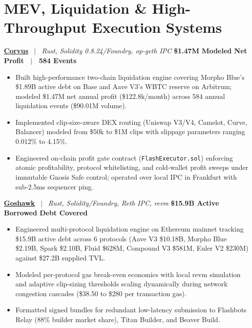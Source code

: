 \documentclass[10pt,a4paper]{article}
\begin{document}
\section{MEV, Liquidation \& High-Throughput Execution Systems}

\textbf{\href{https://github.com/Xtley001/corvus}{Corvus}} \ $|$ \ \textit{Rust, Solidity 0.8.24/Foundry, op-geth IPC} \hfill \textbf{\$1.47M Modeled Net Profit \ $|$ \ 584 Events}
\begin{itemize}
    \item Built high-performance two-chain liquidation engine covering Morpho Blue's \$1.89B active debt on Base and Aave V3's WBTC reserve on Arbitrum; modeled \$1.47M net annual profit (\$122.8k/month) across 584 annual liquidation events (\$90.01M volume).
    \item Implemented clip-size-aware DEX routing (Uniswap V3/V4, Camelot, Curve, Balancer) modeled from \$50k to \$1M clips with slippage parameters ranging 0.012\% to 4.15\%.
    \item Engineered on-chain profit gate contract (\texttt{FlashExecutor.sol}) enforcing atomic profitability, protocol whitelisting, and cold-wallet profit sweeps under immutable Gnosis Safe control; operated over local IPC in Frankfurt with sub-2.5ms sequencer ping.
\end{itemize}

\textbf{\href{https://github.com/Xtley001/goshawk}{Goshawk}} \ $|$ \ \textit{Rust, Solidity/Foundry, Reth IPC, revm} \hfill \textbf{\$15.9B Active Borrowed Debt Covered}
\begin{itemize}
    \item Engineered multi-protocol liquidation engine on Ethereum mainnet tracking \$15.9B active debt across 6 protocols (Aave V3 \$10.18B, Morpho Blue \$2.19B, Spark \$2.10B, Fluid \$628M, Compound V3 \$581M, Euler V2 \$230M) against \$27.2B supplied TVL.
    \item Modeled per-protocol gas break-even economics with local revm simulation and adaptive clip-sizing thresholds scaling dynamically during network congestion cascades (\$38.50 to \$280 per transaction gas).
    \item Formatted signed bundles for redundant low-latency submission to Flashbots Relay (88\% builder market share), Titan Builder, and Beaver Build.
\end{itemize}
\end{document}
